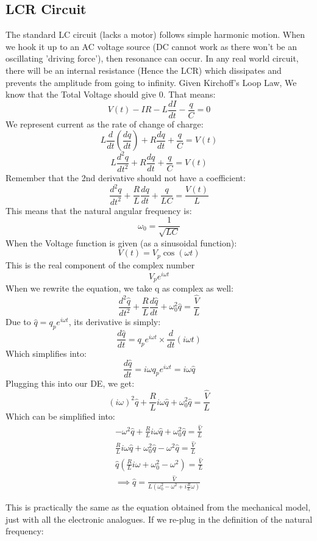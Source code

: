 \documentclass[10pt]{report}
\begin{document}
{\subsection{LCR Circuit}
\par{The standard LC circuit (lacks a motor) follows simple harmonic motion. When we hook it up to an AC voltage source (DC cannot work as there won't be an oscillating 'driving force'), then resonance can occur. In any real world circuit, there will be an internal resistance (Hence the LCR) which dissipates and prevents the amplitude from going to infinity. Given Kirchoff's Loop Law, We know that the Total Voltage should give 0. That means: \[
V\left(t\right)-IR-L\frac{dI}{dt}-\frac{q}{C}=0
\] We represent current as the rate of change of charge: \[
L\frac{d}{dt}\left(\frac{dq}{dt}\right)+R\frac{dq}{dt}+\frac{q}{C}=V\left(t\right)
\] \[
L\frac{d^{2}q}{dt^{2}}+R\frac{dq}{dt}+\frac{q}{C}=V\left(t\right)
\] Remember that the 2nd derivative should not have a coefficient: \[
\frac{d^{2}q}{dt^{2}}+\frac{R}{L}\frac{dq}{dt}+\frac{q}{LC}=\frac{V\left(t\right)}{L}
\] This means that the natural angular frequency is: \[
\omega_{0}=\frac{1}{\sqrt{LC}}
\] When the Voltage function is given (as a sinusoidal function): \[
V\left(t\right)=V_{p}\cos\left(\omega t\right)
\] This is the real component of the complex number \[
V_{p}e^{i\omega t}
\] When we rewrite the equation, we take q as complex as well: \[
\frac{d^{2}\hat{q}}{dt^{2}}+\frac{R}{L}\frac{d\hat{q}}{dt}+\omega_{0}^{2}\hat{q}=\frac{\hat{V}}{L}
\] Due to $\hat{q}=q_{p}e^{i\omega t}$, its derivative is simply: \[
\frac{d\hat{q}}{dt}=q_{p}e^{i\omega t}\times\frac{d}{dt}\left(i\omega t\right)
\] Which simplifies into: \[
\frac{d\hat{q}}{dt}=i\omega q_{p}e^{i\omega t}=i\omega\hat{q}
\] Plugging this into our DE, we get: \[
\left(i\omega \right)^{2}\hat{q}+\frac{R}{L}i\omega\hat{q}+\omega_{0}^{2}\hat{q}=\frac{\hat{V}}{L}
\] Which can be simplified into:} 
\begin{align*}
-\omega^{2}\hat{q}+\frac{R}{L}i\omega\hat{q}+\omega_{0}^{2}\hat{q}=\frac{\hat{V}}{L} \\
\frac{R}{L}i\omega\hat{q}+\omega_{0}^{2}\hat{q}-\omega^{2}\hat{q}=\frac{\hat{V}}{L} \\
\hat{q}\left(\frac{R}{L}i\omega+\omega_{0}^{2}-\omega^{2}\right)=\frac{\hat{V}}{L} \\
\implies\hat{q}=\frac{\hat{V}}{L\left(\omega_{0}^{2}-\omega^{2}+i\frac{R}{L}\omega\right)}
\end{align*}
\par{This is practically the same as the equation obtained from the mechanical model, just with all the electronic analogues. If we re-plug in the definition of the natural frequency:}
}
\end{document}
